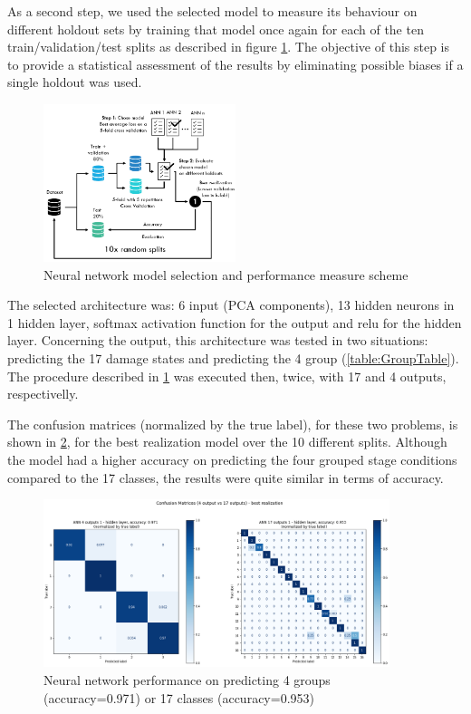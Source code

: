 \documentclass[twocolumn]{article}
\begin{document}
As a second step, we used the selected model to measure its behaviour on different holdout sets by training that model once again for each of the ten train/validation/test splits as described in figure \ref{fig:ann_protocol}. The objective of this step is to provide a statistical assessment of the results by eliminating possible biases if a single holdout was used.

\begin{figure}[H]
      \centering
      \includegraphics[width=0.5\textwidth]{ann_protocol.png}
      \caption{Neural network model selection and performance measure scheme}
      \label{fig:ann_protocol}
\end{figure}


The selected architecture was: 6 input (PCA components), 13 hidden neurons in 1 hidden layer, softmax activation function for the output and relu for the hidden layer. Concerning the output, this architecture was tested in two situations: predicting the 17 damage states and predicting the 4 group (\ref{table:GroupTable}). The procedure described in \ref*{fig:ann_protocol} was executed then, twice, with 17 and 4 outputs, respectivelly.

The confusion matrices (normalized by the true label), for these two problems, is shown in \ref{fig:confusion_matrix}, for the best realization model over the 10 different splits. Although the model had a higher accuracy on predicting the four grouped stage conditions compared to the 17 classes, the results were quite similar in terms of accuracy.

\begin{figure}[t!]
      \centering
      \includegraphics[width=0.9\textwidth]{confusion_matrix.png}
      \caption{Neural network performance on predicting 4 groups (accuracy=0.971) or 17 classes (accuracy=0.953)}
      \label{fig:confusion_matrix}
\end{figure}
\end{document}
